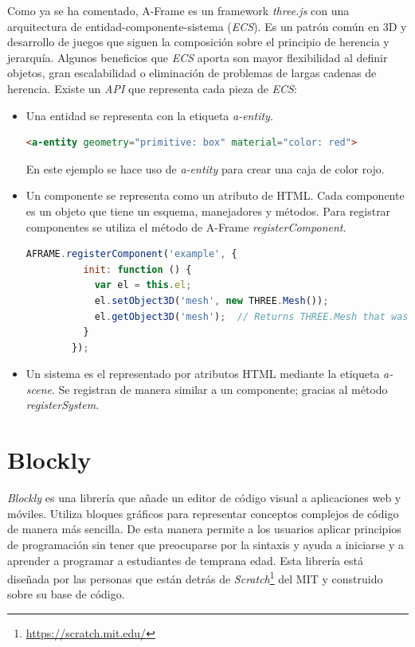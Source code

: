     Como ya se ha comentado, A-Frame es un framework \textit{three.js} con una arquitectura de entidad-componente-sistema (\textit{ECS}). Es un patrón común en 3D y desarrollo de juegos que siguen la composición sobre el principio de herencia y jerarquía. Algunos beneficios que \textit{ECS} aporta son mayor flexibilidad al definir objetos, gran escalabilidad o eliminación de problemas de largas cadenas de herencia. Existe un \textit{API} que representa cada pieza de \textit{ECS}: 
    \begin{itemize}
    \item Una entidad se representa con la etiqueta \textit{a-entity}. 
        \begin{lstlisting}[language=HTML]
        <a-entity geometry="primitive: box" material="color: red">
        \end{lstlisting}
        En este ejemplo se hace uso de \textit{a-entity} para crear una caja de color rojo. 

    
    \item Un componente se representa como un atributo de HTML. Cada componente es un objeto que tiene un esquema, manejadores y métodos. Para registrar componentes se utiliza el método de A-Frame \textit{registerComponent}.
    
    \begin{lstlisting}[language=javascript, caption=Código para registrar un componente]
        AFRAME.registerComponent('example', {
          init: function () {
            var el = this.el;
            el.setObject3D('mesh', new THREE.Mesh());
            el.getObject3D('mesh');  // Returns THREE.Mesh that was just created.
          }
        });
    \end{lstlisting}
    
    \item Un sistema es el representado por atributos HTML mediante la etiqueta \textit{a-scene}. Se registran de manera similar a un componente; gracias al método \textit{registerSystem}.
\end{itemize}


\section{Blockly}
\label{sec:blockly}
\textit{Blockly} es una librería que añade un editor de código visual a aplicaciones web y móviles. Utiliza bloques gráficos para representar conceptos complejos de código de manera más sencilla. De esta manera permite a los usuarios aplicar  principios de programación sin tener que preocuparse por la sintaxis y ayuda a iniciarse y a aprender a programar a estudiantes de temprana edad. Esta librería está diseñada por las personas que están detrás de \textit{Scratch}\footnote{\url{https://scratch.mit.edu/}} del MIT y construido sobre su base de código. 

